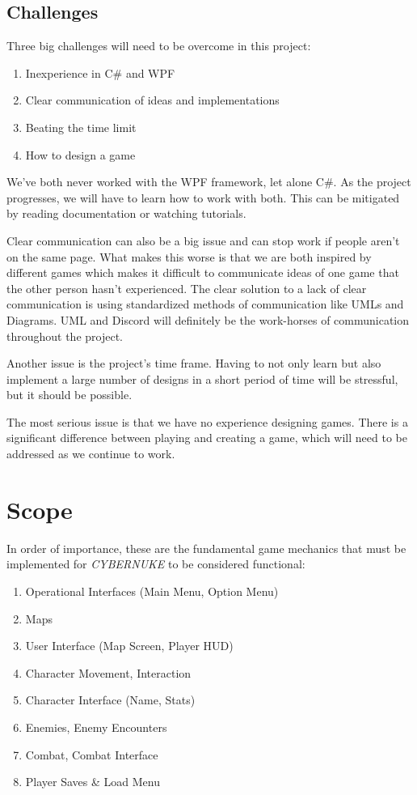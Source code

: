 \documentclass[10pt,conference,onecolumn,compsoc]{IEEEtran}
\begin{document}
\subsection{Challenges}
Three big challenges will need to be overcome in this project:
\begin{enumerate}
\item Inexperience in C\# and WPF
\item Clear communication of ideas and implementations
\item Beating the time limit
\item How to design a game
\end{enumerate}
We've both never worked with the WPF framework, let alone C\#. As the project progresses, we will have to learn how to work with both. This can be mitigated by reading documentation or watching tutorials.

Clear communication can also be a big issue and can stop work if people aren't on the same page. What makes this worse is that we are both inspired by different games which makes it difficult to communicate ideas of one game that the other person hasn't experienced. The clear solution to a lack of clear communication is using standardized methods of communication like UMLs and Diagrams. UML and Discord will definitely be the work-horses of communication throughout the project.

Another issue is the project's time frame. Having to not only learn but also implement a large number of designs in a short period of time will be stressful, but it should be possible.

The most serious issue is that we have no experience designing games. There is a significant difference between playing and creating a game, which will need to be addressed as we continue to work. 

\pagebreak
\section{Scope}
In order of importance, these are the fundamental game mechanics that must be implemented for \emph{CYBERNUKE} to be considered functional:
\begin{enumerate}
\item Operational Interfaces (Main Menu, Option Menu)
\item Maps
\item User Interface (Map Screen, Player HUD)
\item Character Movement, Interaction
\item Character Interface (Name, Stats)
\item Enemies, Enemy Encounters
\item Combat, Combat Interface
\item Player Saves \& Load Menu
\end{enumerate} 
\end{document}
